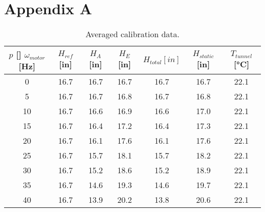 \chapter{Appendix A}
\begin{table}[htpb]
    \caption{Averaged calibration data.}
    \label{tab:calibration_data}
    \centering
    \begin{tabular}{ccccccc}
        \toprule
        $p$ [\unit{}]
        $\omega_{motor}$ [\unit{\hertz}] & $H_{ref}$ [\unit{in}] & $H_A$ [\unit{in}] & $H_E$ [\unit{in}] & $H_{total} [\unit{in}]$ & $H_{static}$ [\unit{in}] & $T_{tunnel}$ [\unit{\degreeCelsius}] \\ 
        \midrule
        \num{0} & \num{16.7} & \num{16.7} & \num{16.7} & \num{16.7} & \num{16.7} & \num{22.1} \\
        \num{5} & \num{16.7} & \num{16.7} & \num{16.8} & \num{16.7} & \num{16.8} & \num{22.1} \\
        \num{10} & \num{16.7} & \num{16.6} & \num{16.9} & \num{16.6} & \num{17.0} & \num{22.1} \\
        \num{15} & \num{16.7} & \num{16.4} & \num{17.2} & \num{16.4} & \num{17.3} & \num{22.1} \\
        \num{20} & \num{16.7} & \num{16.1} & \num{17.6} & \num{16.1} & \num{17.6} & \num{22.1} \\
        \num{25} & \num{16.7} & \num{15.7} & \num{18.1} & \num{15.7} & \num{18.2} & \num{22.1} \\
        \num{30} & \num{16.7} & \num{15.2} & \num{18.6} & \num{15.2} & \num{18.9} & \num{22.1} \\
        \num{35} & \num{16.7} & \num{14.6} & \num{19.3} & \num{14.6} & \num{19.7} & \num{22.1} \\
        \num{40} & \num{16.7} & \num{13.9} & \num{20.2} & \num{13.8} & \num{20.6} & \num{22.1} \\
        \bottomrule
    \end{tabular}
\end{table}